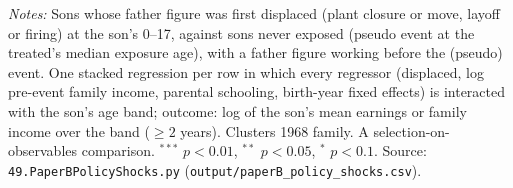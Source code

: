 \begin{table}[!htbp]
\begin{minipage}{\textwidth}\footnotesize \textit{Notes:} Sons whose father figure was first displaced (plant closure or move, layoff or firing) at the son's 0--17, against sons never exposed (pseudo event at the treated's median exposure age), with a father figure working before the (pseudo) event. One stacked regression per row in which every regressor (displaced, log pre-event family income, parental schooling, birth-year fixed effects) is interacted with the son's age band; outcome: log of the son's mean earnings or family income over the band ($\geq 2$ years). Clusters 1968 family. A selection-on-observables comparison. $^{***}$ $p<0.01$, $^{**}$ $p<0.05$, $^{*}$ $p<0.1$. Source: \texttt{49.PaperBPolicyShocks.py} (\texttt{output/paperB\_policy\_shocks.csv}).\end{minipage}
\end{table}
